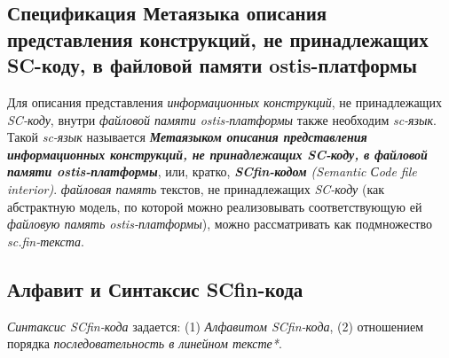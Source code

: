 \subsection{Спецификация Метаязыка описания представления конструкций, не принадлежащих SC-коду, в файловой памяти ostis-платформы}
\label{sec_soft_platform_scfin_code}

Для описания представления \textit{информационных конструкций}, не принадлежащих \textit{SC-коду}, внутри \textit{файловой памяти ostis-платформы} также необходим \textit{sc-язык}. Такой \textit{sc-язык} называется \textbf{\textit{Метаязыком описания представления информационных конструкций, не принадлежащих SC-коду, в файловой памяти ostis-платформы}}, или, кратко, \textit{\textbf{SCfin-кодом} (Semantic Сode file interior)}. \textit{файловая память} текстов, не принадлежащих \textit{SC-коду} (как абстрактную модель, по которой можно реализовывать соответствующую ей \textit{файловую память ostis-платформы}), можно рассматривать как подмножество \textit{sc.fin-текста}.

\begin{SCn}
\begin{scnindent}
\end{scnindent}
\end{SCn}

\subsection{Алфавит и Синтаксис SCfin-кода}
\label{sec_soft_platform_scfin_code_alphabet_and_syntax}

\textit{Синтаксис SCfin-кода} задается: (1) \textit{Алфавитом SCfin-кода\scnsupergroupsign}, (2) отношением порядка \textit{последовательность в линейном тексте*}.

\begin{SCn}
\begin{scneqtoset}
\end{scneqtoset}
\end{SCn}

